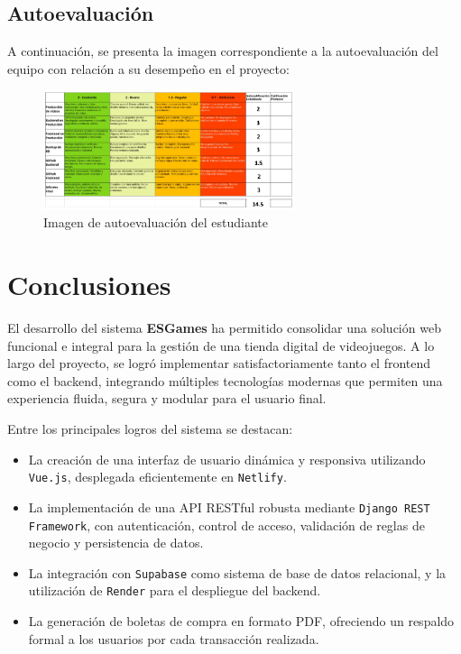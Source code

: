 \documentclass{article}
\begin{document}
\subsection{Autoevaluación}

A continuación, se presenta la imagen correspondiente a la autoevaluación del equipo con relación a su desempeño en el proyecto:

\begin{figure}[H]
    \centering
    \includegraphics[width=0.65\textwidth]{img/autoevaluacion.png}
    \caption{Imagen de autoevaluación del estudiante}
\end{figure}


\section{Conclusiones}

El desarrollo del sistema \textbf{ESGames} ha permitido consolidar una solución web funcional e integral para la gestión de una tienda digital de videojuegos. A lo largo del proyecto, se logró implementar satisfactoriamente tanto el frontend como el backend, integrando múltiples tecnologías modernas que permiten una experiencia fluida, segura y modular para el usuario final.

Entre los principales logros del sistema se destacan:

\begin{itemize}
    \item La creación de una interfaz de usuario dinámica y responsiva utilizando \texttt{Vue.js}, desplegada eficientemente en \texttt{Netlify}.
    \item La implementación de una API RESTful robusta mediante \texttt{Django REST Framework}, con autenticación, control de acceso, validación de reglas de negocio y persistencia de datos.
    \item La integración con \texttt{Supabase} como sistema de base de datos relacional, y la utilización de \texttt{Render} para el despliegue del backend.
    \item La generación de boletas de compra en formato PDF, ofreciendo un respaldo formal a los usuarios por cada transacción realizada.
\end{itemize}
\end{document}
